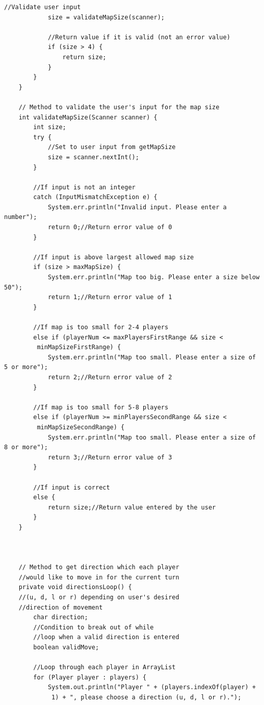 \documentclass[a4paper,12pt]{extarticle}
\begin{document}
\begin{lstlisting}[caption=The initial code of the Game class, label=amb]
            //Validate user input
            size = validateMapSize(scanner);

            //Return value if it is valid (not an error value)
            if (size > 4) {
                return size;
            }
        }
    }

    // Method to validate the user's input for the map size
    int validateMapSize(Scanner scanner) {
        int size;
        try {
            //Set to user input from getMapSize
            size = scanner.nextInt();
        }

        //If input is not an integer
        catch (InputMismatchException e) {
            System.err.println("Invalid input. Please enter a number");
            return 0;//Return error value of 0
        }

        //If input is above largest allowed map size
        if (size > maxMapSize) {
            System.err.println("Map too big. Please enter a size below 50");
            return 1;//Return error value of 1
        }

        //If map is too small for 2-4 players
        else if (playerNum <= maxPlayersFirstRange && size <
         minMapSizeFirstRange) {
            System.err.println("Map too small. Please enter a size of 5 or more");
            return 2;//Return error value of 2
        }

        //If map is too small for 5-8 players
        else if (playerNum >= minPlayersSecondRange && size <
         minMapSizeSecondRange) {
            System.err.println("Map too small. Please enter a size of 8 or more");
            return 3;//Return error value of 3
        }

        //If input is correct
        else {
            return size;//Return value entered by the user
        }
    }



    // Method to get direction which each player 
    //would like to move in for the current turn
    private void directionsLoop() {
    //(u, d, l or r) depending on user's desired 
    //direction of movement
        char direction;
        //Condition to break out of while 
        //loop when a valid direction is entered
        boolean validMove;

        //Loop through each player in ArrayList
        for (Player player : players) {
            System.out.println("Player " + (players.indexOf(player) +
             1) + ", please choose a direction (u, d, l or r).");


\end{lstlisting}
\end{document}
